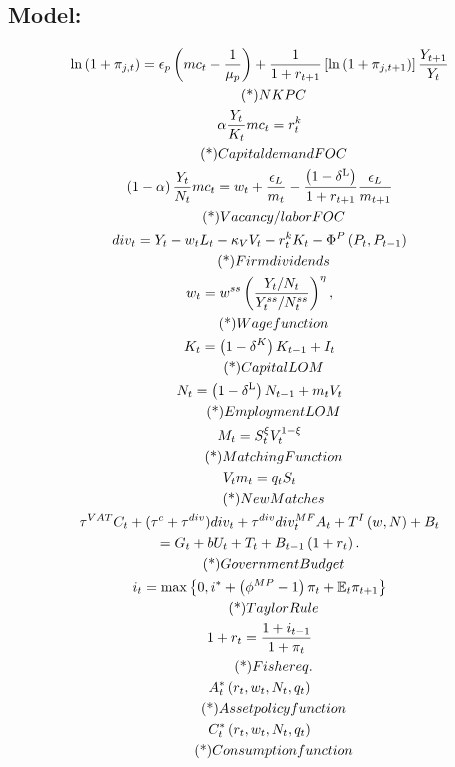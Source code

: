 \subsection{Model:}
\begin{gather}
  \ln\left(1+\pi_{j,t}\right)=\epsilon_{p}\left(mc_{t}-\frac{1}{\mu_{p}}\right)+\frac{1}{1+r_{t+1}}\left[\ln\left(1+\pi_{j,t+1}\right)\right]\frac{Y_{t+1}}{Y_{t}} \\ \eqname{NKPC} \\
 \alpha\frac{Y_{t}}{K_{t}}mc_{t}=r_{t}^{k} \\ \eqname{Capital demand FOC} \\
  \left(1-\alpha\right)\frac{Y_{t}}{N_{t}}mc_{t}=w_{t}+\frac{\epsilon_{L}}{m_{t}}-\frac{\left(1-\delta^{\text{L}}\right)}{1+r_{t+1}}\frac{\epsilon_{L}}{m_{t+1}}   \label{abc} \\ \eqname{Vacancy/labor FOC} \\
div_{t}=Y_{t}-w_{t}L_{t}-\kappa_{V}V_{t}-r_{t}^{k}K_{t}-\Phi^{P}\left(P_{t},P_{t-1}\right)  \\ \eqname{Firm dividends}   \\
  w_{t}=w^{ss}\left(\frac{Y_{t}/N_{t}}{Y_{t}^{ss}/N_{t}^{ss}}\right)^{\eta},  \\ \eqname{Wage function}  \\
  K_{t}=\left(1-\delta^{K}\right)K_{t-1}+I_{t} \\ \eqname{Capital LOM}  \\
  N_{t}=\left(1-\delta^{\text{L}}\right)N_{t-1}+m_{t}V_{t} \\ \eqname{Employment LOM}  \\
  M_{t}=S_{t}^{\xi}V_{t}^{1-\xi}   \\ \eqname{Matching Function}  \\
  V_{t}m_{t}=q_{t}S_{t}  \\ \eqname{New Matches}  \\
  \tau^{VAT}C_{t}+(\tau^{c}+\tau^{div})div_{t}+\tau^{div}div_{t}^{MF}A_{t}+T^{I}\left(w,N\right)+B_{t} \\
=G_{t}+bU_{t}+T_{t}+B_{t-1}\left(1+r_{t}\right). \\ \eqname{Government Budget}  \\
i_{t}=\max\left\{ 0,i^{*}+\left(\phi^{MP}-1\right)\pi_{t}+\mathbb{E}_{t}\pi_{t+1}\right\} \\ \eqname{Taylor Rule}  \\
1+r_{t}=\frac{1+i_{t-1}}{1+\pi_{t}} \\ \eqname{Fisher eq.}  \\
A_{t}^{*}\left(r_{t},w_{t},N_{t},q_{t}\right) \\ \eqname{Asset policy function}   \\
C_{t}^{*}\left(r_{t},w_{t},N_{t},q_{t}\right) \\ \eqname{Consumption function}    
\end{gather}
